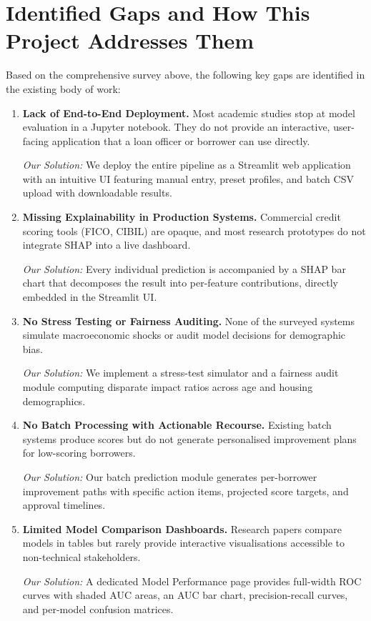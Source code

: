 \documentclass[12pt,a4paper]{report}
\begin{document}
\section{Identified Gaps and How This Project Addresses Them}

Based on the comprehensive survey above, the following key gaps are identified in the existing body of work:

\begin{enumerate}[label=\textbf{Gap \arabic*:}]
    \item \textbf{Lack of End-to-End Deployment.} Most academic studies stop at model evaluation in a Jupyter notebook. They do not provide an interactive, user-facing application that a loan officer or borrower can use directly.

    \textit{Our Solution:} We deploy the entire pipeline as a Streamlit web application with an intuitive UI featuring manual entry, preset profiles, and batch CSV upload with downloadable results.

    \item \textbf{Missing Explainability in Production Systems.} Commercial credit scoring tools (FICO, CIBIL) are opaque, and most research prototypes do not integrate SHAP into a live dashboard.

    \textit{Our Solution:} Every individual prediction is accompanied by a SHAP bar chart that decomposes the result into per-feature contributions, directly embedded in the Streamlit UI.

    \item \textbf{No Stress Testing or Fairness Auditing.} None of the surveyed systems simulate macroeconomic shocks or audit model decisions for demographic bias.

    \textit{Our Solution:} We implement a stress-test simulator and a fairness audit module computing disparate impact ratios across age and housing demographics.

    \item \textbf{No Batch Processing with Actionable Recourse.} Existing batch systems produce scores but do not generate personalised improvement plans for low-scoring borrowers.

    \textit{Our Solution:} Our batch prediction module generates per-borrower improvement paths with specific action items, projected score targets, and approval timelines.

    \item \textbf{Limited Model Comparison Dashboards.} Research papers compare models in tables but rarely provide interactive visualisations accessible to non-technical stakeholders.

    \textit{Our Solution:} A dedicated Model Performance page provides full-width ROC curves with shaded AUC areas, an AUC bar chart, precision-recall curves, and per-model confusion matrices.
\end{enumerate}
\end{document}
